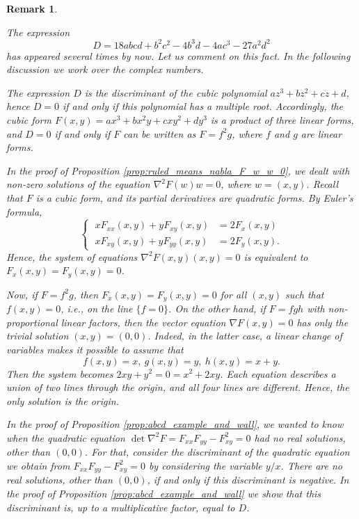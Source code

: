 \documentclass[12pt]{article}
\newtheorem{remark}[lemma]{Remark}
\begin{document}

\begin{remark} \label{Bezout}
{\rm
The expression
$$
D=18abcd+b^2c^2-4b^3d-4ac^3-27a^2d^2
$$
has appeared several times by now. Let us comment on this fact. In the following discussion we work over the complex numbers.

The expression  $D$ is the discriminant of the cubic polynomial $az^3+bz^2+cz+d$, hence $D=0$ if and only if this polynomial has a multiple root. Accordingly, the cubic form $F(x,y)=ax^3+bx^2y+cxy^2+dy^3$ is a product of three linear forms, and $D=0$ if and only if $F$ can be written as 
$F=f^2 g$, where $f$ and $g$ are linear forms.

In the proof of Proposition \ref{prop:ruled_means_nabla_F_w_w_0}, we dealt with non-zero solutions of the equation $\nabla^2F (w) w =0$, where $w=(x,y)$. Recall that $F$ is a cubic form, and its partial derivatives are quadratic forms. By Euler's formula, 
$$
\left\{\;
\begin{aligned}
x F_{xx}(x,y)+yF_{xy}(x,y)&=2F_x(x,y)\\
xF_{xy}(x,y)+yF_{yy}(x,y)&=2F_y(x,y).
\end{aligned}
\right.
$$
Hence, %
the system of equations $\nabla^2F(x,y)(x,y)=0$ is equivalent to $F_x(x,y)=F_y(x,y)=0$.

Now, if $F=f^2g$, then $F_x(x,y)=F_y(x,y)=0$ for all $(x,y)$ such that $f(x,y)=0$, i.e., on the line $\{f=0\}$. %
On the other hand, if $F=fgh$ with non-proportional linear factors, then the vector equation $\nabla F(x,y)=0$  
has only the trivial solution $(x,y)=(0,0)$.  Indeed, in the latter case, a linear change of variables makes it possible to assume that
$$
f(x,y)=x,\ g(x,y)=y,\ h(x,y)=x+y.
$$
Then the system becomes $2xy+y^2=0=x^2+2xy$. Each equation describes a union of two lines through the origin, and all four lines are different. Hence, the only solution is the origin. 

In the proof of Proposition \ref{prop:abcd_example_and_wall}, we wanted to know when the quadratic equation $\det \nabla^2F=F_{xx}F_{yy}-F_{xy}^2=0$ had no real solutions, other than $(0,0)$. For that, consider the discriminant of the quadratic equation we obtain from $F_{xx}F_{yy}-F_{xy}^2=0$ by considering the variable $y/x$. There are no real solutions, other than $(0,0)$, if and only if this discriminant is negative. In the proof of Proposition \ref{prop:abcd_example_and_wall} we show that this discriminant is, up to a multiplicative factor, equal to $D$.

}
\end{remark}
\end{document}
